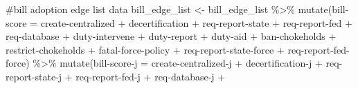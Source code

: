 \documentclass[
  letterpaper,
  DIV=11,
  numbers=noendperiod]{scrartcl}
\newenvironment{Shaded}{\begin{snugshade}}{\end{snugshade}}
\newcommand{\AttributeTok}[1]{\textcolor[rgb]{0.40,0.45,0.13}{#1}}
\newcommand{\CommentTok}[1]{\textcolor[rgb]{0.37,0.37,0.37}{#1}}
\newcommand{\FunctionTok}[1]{\textcolor[rgb]{0.28,0.35,0.67}{#1}}
\newcommand{\NormalTok}[1]{\textcolor[rgb]{0.00,0.23,0.31}{#1}}
\newcommand{\OtherTok}[1]{\textcolor[rgb]{0.00,0.23,0.31}{#1}}
\newcommand{\SpecialCharTok}[1]{\textcolor[rgb]{0.37,0.37,0.37}{#1}}
\newcommand{\StringTok}[1]{\textcolor[rgb]{0.13,0.47,0.30}{#1}}
\begin{document}
\begin{Shaded}
\begin{Highlighting}[]
\CommentTok{\#bill adoption edge list data}
\NormalTok{bill\_edge\_list }\OtherTok{\textless{}{-}}\NormalTok{ bill\_edge\_list }\SpecialCharTok{\%\textgreater{}\%} 
  \FunctionTok{mutate}\NormalTok{(}\StringTok{\textasciigrave{}}\AttributeTok{bill{-}score}\StringTok{\textasciigrave{}} \OtherTok{=} \StringTok{\textasciigrave{}}\AttributeTok{create{-}centralized}\StringTok{\textasciigrave{}} \SpecialCharTok{+}
\NormalTok{           decertification }\SpecialCharTok{+}
           \StringTok{\textasciigrave{}}\AttributeTok{req{-}report{-}state}\StringTok{\textasciigrave{}} \SpecialCharTok{+}
           \StringTok{\textasciigrave{}}\AttributeTok{req{-}report{-}fed}\StringTok{\textasciigrave{}} \SpecialCharTok{+}
           \StringTok{\textasciigrave{}}\AttributeTok{req{-}database}\StringTok{\textasciigrave{}} \SpecialCharTok{+}
           \StringTok{\textasciigrave{}}\AttributeTok{duty{-}intervene}\StringTok{\textasciigrave{}} \SpecialCharTok{+}
           \StringTok{\textasciigrave{}}\AttributeTok{duty{-}report}\StringTok{\textasciigrave{}} \SpecialCharTok{+}
           \StringTok{\textasciigrave{}}\AttributeTok{duty{-}aid}\StringTok{\textasciigrave{}} \SpecialCharTok{+}
           \StringTok{\textasciigrave{}}\AttributeTok{ban{-}chokeholds}\StringTok{\textasciigrave{}} \SpecialCharTok{+}
           \StringTok{\textasciigrave{}}\AttributeTok{restrict{-}chokeholds}\StringTok{\textasciigrave{}} \SpecialCharTok{+}
           \StringTok{\textasciigrave{}}\AttributeTok{fatal{-}force{-}policy}\StringTok{\textasciigrave{}} \SpecialCharTok{+}
           \StringTok{\textasciigrave{}}\AttributeTok{req{-}report{-}state{-}force}\StringTok{\textasciigrave{}} \SpecialCharTok{+}
           \StringTok{\textasciigrave{}}\AttributeTok{req{-}report{-}fed{-}force}\StringTok{\textasciigrave{}}\NormalTok{) }\SpecialCharTok{\%\textgreater{}\%} 
  \FunctionTok{mutate}\NormalTok{(}\StringTok{\textasciigrave{}}\AttributeTok{bill{-}score{-}j}\StringTok{\textasciigrave{}} \OtherTok{=} \StringTok{\textasciigrave{}}\AttributeTok{create{-}centralized{-}j}\StringTok{\textasciigrave{}} \SpecialCharTok{+}
           \StringTok{\textasciigrave{}}\AttributeTok{decertification{-}j}\StringTok{\textasciigrave{}} \SpecialCharTok{+}
           \StringTok{\textasciigrave{}}\AttributeTok{req{-}report{-}state{-}j}\StringTok{\textasciigrave{}} \SpecialCharTok{+}
           \StringTok{\textasciigrave{}}\AttributeTok{req{-}report{-}fed{-}j}\StringTok{\textasciigrave{}} \SpecialCharTok{+}
           \StringTok{\textasciigrave{}}\AttributeTok{req{-}database{-}j}\StringTok{\textasciigrave{}} \SpecialCharTok{+}

\end{Highlighting}
\end{Shaded}
\end{document}
